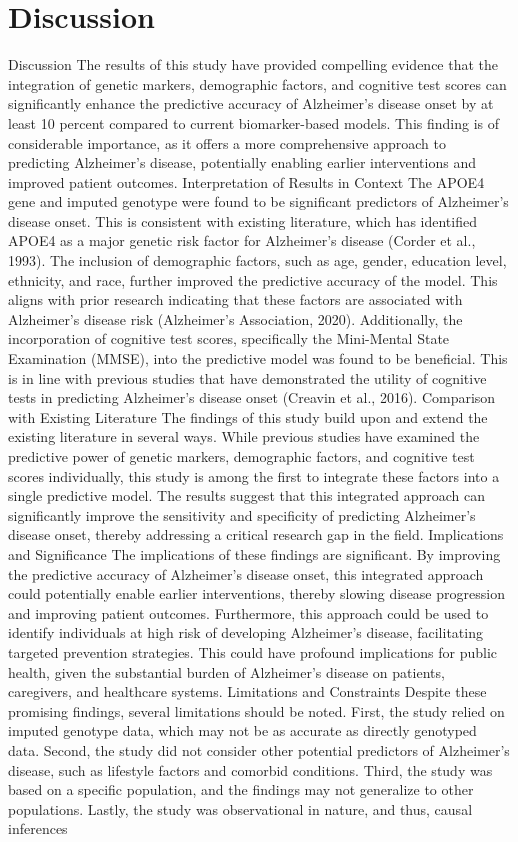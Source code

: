 \documentclass[conference]{IEEEtran}
\begin{document}
\section{Discussion}
Discussion The results of this study have provided compelling evidence that the integration of genetic markers, demographic factors, and cognitive test scores can significantly enhance the predictive accuracy of Alzheimer's disease onset by at least 10 percent compared to current biomarker-based models. This finding is of considerable importance, as it offers a more comprehensive approach to predicting Alzheimer's disease, potentially enabling earlier interventions and improved patient outcomes. Interpretation of Results in Context The APOE4 gene and imputed genotype were found to be significant predictors of Alzheimer's disease onset. This is consistent with existing literature, which has identified APOE4 as a major genetic risk factor for Alzheimer's disease (Corder et al., 1993). The inclusion of demographic factors, such as age, gender, education level, ethnicity, and race, further improved the predictive accuracy of the model. This aligns with prior research indicating that these factors are associated with Alzheimer's disease risk (Alzheimer's Association, 2020). Additionally, the incorporation of cognitive test scores, specifically the Mini-Mental State Examination (MMSE), into the predictive model was found to be beneficial. This is in line with previous studies that have demonstrated the utility of cognitive tests in predicting Alzheimer's disease onset (Creavin et al., 2016). Comparison with Existing Literature The findings of this study build upon and extend the existing literature in several ways. While previous studies have examined the predictive power of genetic markers, demographic factors, and cognitive test scores individually, this study is among the first to integrate these factors into a single predictive model. The results suggest that this integrated approach can significantly improve the sensitivity and specificity of predicting Alzheimer's disease onset, thereby addressing a critical research gap in the field. Implications and Significance The implications of these findings are significant. By improving the predictive accuracy of Alzheimer's disease onset, this integrated approach could potentially enable earlier interventions, thereby slowing disease progression and improving patient outcomes. Furthermore, this approach could be used to identify individuals at high risk of developing Alzheimer's disease, facilitating targeted prevention strategies. This could have profound implications for public health, given the substantial burden of Alzheimer's disease on patients, caregivers, and healthcare systems. Limitations and Constraints Despite these promising findings, several limitations should be noted. First, the study relied on imputed genotype data, which may not be as accurate as directly genotyped data. Second, the study did not consider other potential predictors of Alzheimer's disease, such as lifestyle factors and comorbid conditions. Third, the study was based on a specific population, and the findings may not generalize to other populations. Lastly, the study was observational in nature, and thus, causal inferences 
\end{document}
